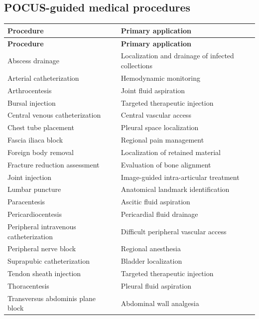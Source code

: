 \subsection{POCUS-guided medical procedures}
\begin{longtable}{@{}p{}p{}@{}}
\toprule
\textbf{Procedure} & \textbf{Primary application} \\
\midrule
\endfirsthead
\toprule
\textbf{Procedure} & \textbf{Primary application} \\
\midrule
\endhead
Abscess drainage & Localization and drainage of infected collections \\
Arterial catheterization & Hemodynamic monitoring \\
Arthrocentesis & Joint fluid aspiration \\
Bursal injection & Targeted therapeutic injection \\
Central venous catheterization & Central vascular access \\
Chest tube placement & Pleural space localization \\
Fascia iliaca block & Regional pain management \\
Foreign body removal & Localization of retained material \\
Fracture reduction assessment & Evaluation of bone alignment \\
Joint injection & Image-guided intra-articular treatment \\
Lumbar puncture & Anatomical landmark identification \\
Paracentesis & Ascitic fluid aspiration \\
Pericardiocentesis & Pericardial fluid drainage \\
Peripheral intravenous catheterization & Difficult peripheral vascular access \\
Peripheral nerve block & Regional anesthesia \\
Suprapubic catheterization & Bladder localization \\
Tendon sheath injection & Targeted therapeutic injection \\
Thoracentesis & Pleural fluid aspiration \\
Transversus abdominis plane block & Abdominal wall analgesia \\
\bottomrule
\end{longtable}

